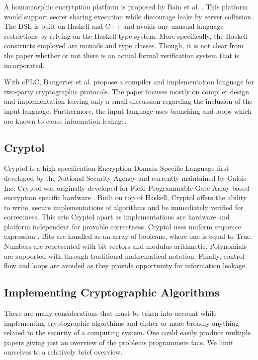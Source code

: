 A homomorphic encrytption platform is proposed by Bain et al. \cite{Bain}. This platform would support secret sharing execution while discourage leaks by server collusion. The DSL is built on Haskell and C++ and avoids any unusual language restrictions by relying on the Haskell type system. More specifically, the Haskell constructs employed are monads and type classes. Though, it is not clear from the paper whether or not there is an actual formal verification system that is incorporated.  

With cPLC, Bangerter et al. \cite{Bangerter} propose a compiler and implementation language for two-party cryptographic protocols. The paper focuses mostly on compiler design and implementation leaving only a small discussion regarding the inclusion of the input language. Furthermore, the input language uses branching and loops which are known to cause information leakage. 


\subsection{Cryptol}
Cryptol is a high specification Encryption Domain Specific Language first developed by the National Security Agency and currently maintained by Galois Inc. Cryptol was originally developed for Field Programmable Gate Array based encryption specific hardware \cite{Lewis}. Built on top of Haskell, Cryptol offers the ability to write, secure implementations of algorithms and be immediately verified for correctness. This sets Cryptol apart as implementations are hardware and platform independent for provable correctness. Cryptol uses uniform sequence expression \cite{Lewis}. Bits are handled as an array of booleans, where one is equal to True. Numbers are represented with bit vectors and modulus arithmetic. Polynomials are supported with through traditional mathematical notation. Finally, control flow and loops are avoided as they provide opportunity for information leakage. 

\subsection{Implementing Cryptographic Algorithms}
There are many considerations that must be taken into account while implementing cryptographic algorthims and cipher or more broadly anything related to the security of 
a computing system\cite{CryptoCoding}. One could easily produce multiple papers giving just an overview of the problems programmers face. We limit ourselves to a relatively brief overview.

